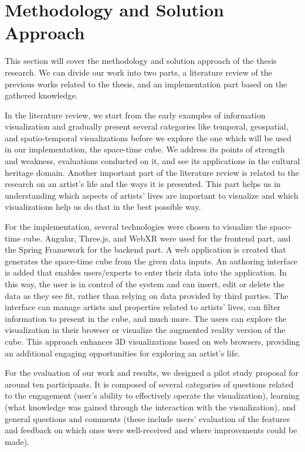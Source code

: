 \section{Methodology and Solution Approach}\label{sec:methodology-solution-approach}
This section will cover the methodology and solution approach of the thesis research. We can divide our work into two parts, a literature
review of the previous works related to the thesis, and an implementation part based on the gathered knowledge.

In the literature review, we start from the early examples of information visualization and gradually present several categories like temporal,
geospatial, and spatio-temporal visualizations before we explore the one which will be used in our implementation, the space-time cube. We
address its points of strength and weakness, evaluations conducted on it, and see its applications in the cultural heritage domain. Another
important part of the literature review is related to the research on an artist’s life and the ways it is presented. This part helps us in
understanding which aspects of artists' lives are important to visualize and which visualizations help us do that in the best possible way.

For the implementation, several technologies were chosen to visualize the space-time cube. Angular, Three.js, and WebXR were used for the
frontend part, and the Spring Framework for the backend part. A web application is created that generates the space-time cube from the given data
inputs. An authoring interface is added that enables users/experts to enter their data into the application. In this way, the user is in control
of the system and can insert, edit or delete the data as they see fit, rather than relying on data provided by third parties. The interface can
manage artists and properties related to artists' lives, can filter information to present in the cube, and much more. The users can explore the
visualization in their browser or visualize the augmented reality version of the cube. This approach enhances 3D visualizations based on web
browsers, providing an additional engaging opportunities for exploring an artist's life.

For the evaluation of our work and results, we designed a pilot study proposal for around ten participants. It is composed of several
categories of questions related to the engagement (user's ability to effectively operate the visualization), learning (what knowledge was gained
through the interaction with the visualization), and general questions and comments (these include users' evaluation of the features and
feedback on which ones were well-received and where improvements could be made).
